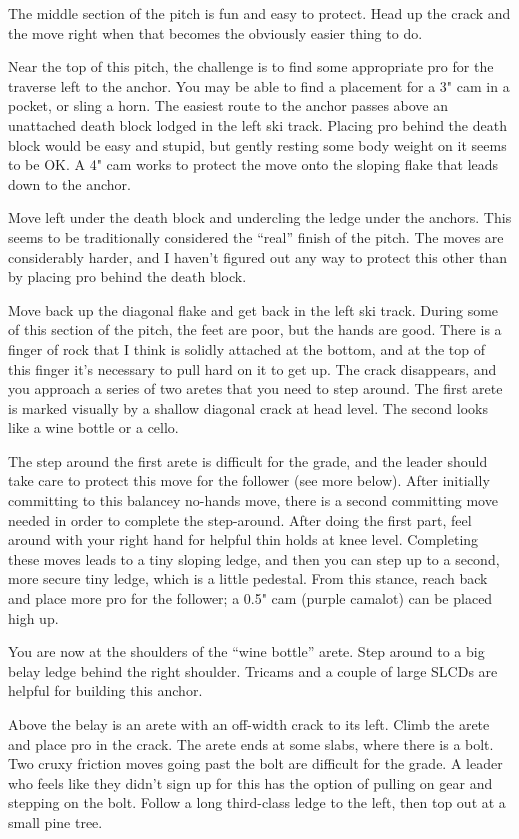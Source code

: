 \documentclass{tahquitz}
\begin{document}
The middle section of the pitch is fun and easy to protect.
Head up the crack and the move right when that becomes the obviously
easier thing to do.

Near the top of this pitch, the challenge is to
find some appropriate pro for the traverse left to the anchor.
You may be able to find a placement for a 3" cam in a pocket, or
sling a horn. The easiest route to the anchor passes above an unattached
death block lodged in the left ski track. Placing pro behind the death block
would be easy and stupid, but gently resting some body weight on it seems
to be OK. A 4" cam works to protect the move onto the sloping flake that
leads down to the anchor.

 Move left under the death block and undercling the ledge
under the anchors. This seems to be traditionally considered the ``real'' finish of the pitch.
The moves are considerably harder, and I haven't figured out any way to protect this other
than by placing pro behind the death block.

 Move back up the diagonal flake and get back in the left ski track.
During some of this section of the pitch, the feet are poor, but the hands are good.
There is a finger of rock that I think is solidly attached at the bottom, and at the top
of this finger it's necessary to pull hard on it to get up. The crack disappears,
and you approach a series of two aretes that you need to step around.
The first
arete is marked visually by a shallow diagonal crack at head level. The second
looks like a wine bottle or a cello.

The step
around the first arete is difficult for the grade, and the leader should take
care to protect this move for the follower (see more below). After initially committing
to this balancey no-hands move, there is a second committing move needed in order
to complete the step-around. After doing the first part, feel around with your
right hand for helpful thin holds at knee level. Completing these moves
leads to a tiny sloping ledge, and then you can step up to a second, more secure tiny
ledge, which is a little pedestal. From this stance, reach back and place more pro
for the follower; a 0.5" cam (purple camalot) can be placed high up. 

You are now at the shoulders of the ``wine bottle'' arete. Step around to
a big belay ledge behind the right shoulder. Tricams and a couple of
large SLCDs are helpful for building this anchor.

 Above the belay is an arete with an off-width crack to its left.
Climb the arete and place pro in the crack. The arete ends at some
slabs, where there is a bolt. Two cruxy friction moves going past the bolt are difficult for
the grade. A leader who feels like they didn't sign up for this has the option
of pulling on gear and stepping on the bolt. Follow a long third-class ledge to
the left, then top out at a small pine tree.
\end{document}
